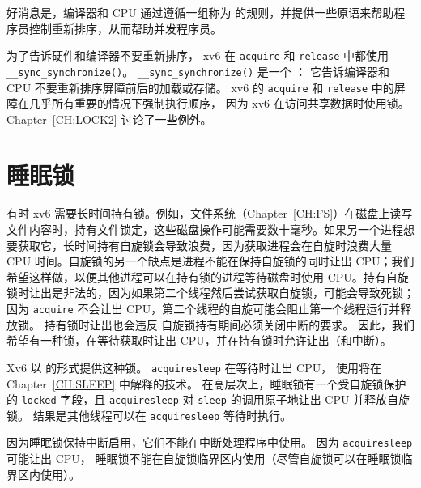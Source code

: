 好消息是，编译器和 CPU 通过遵循一组称为
的规则，并提供一些原语来帮助程序员控制重新排序，从而帮助并发程序员。

为了告诉硬件和编译器不要重新排序，
xv6 在
\lstinline{acquire} 
和
\lstinline{release} 
中都使用
\lstinline{__sync_synchronize()}。
\lstinline{__sync_synchronize()}
是一个
：
它告诉编译器和 CPU 不要重新排序屏障前后的加载或存储。
xv6 的
\lstinline{acquire}
和
\lstinline{release}
中的屏障在几乎所有重要的情况下强制执行顺序，
因为 xv6 在访问共享数据时使用锁。
Chapter~\ref{CH:LOCK2} 讨论了一些例外。

\section{睡眠锁}


有时 xv6 需要长时间持有锁。例如，文件系统（Chapter~\ref{CH:FS}）在磁盘上读写文件内容时，持有文件锁定，这些磁盘操作可能需要数十毫秒。如果另一个进程想要获取它，长时间持有自旋锁会导致浪费，因为获取进程会在自旋时浪费大量 CPU 时间。自旋锁的另一个缺点是进程不能在保持自旋锁的同时让出 CPU；我们希望这样做，以便其他进程可以在持有锁的进程等待磁盘时使用 CPU。持有自旋锁时让出是非法的，因为如果第二个线程然后尝试获取自旋锁，可能会导致死锁；因为 {\tt acquire} 不会让出 CPU，第二个线程的自旋可能会阻止第一个线程运行并释放锁。
持有锁时让出也会违反
自旋锁持有期间必须关闭中断的要求。
因此，我们希望有一种锁，在等待获取时让出 CPU，并在持有锁时允许让出（和中断）。

Xv6 以
的形式提供这种锁。
\lstinline{acquiresleep}
在等待时让出 CPU，
使用将在
Chapter~\ref{CH:SLEEP}
中解释的技术。
在高层次上，睡眠锁有一个受自旋锁保护的
\lstinline{locked}
字段，且
\lstinline{acquiresleep} 对
\lstinline{sleep}
的调用原子地让出 CPU 并释放自旋锁。
结果是其他线程可以在
\lstinline{acquiresleep}
等待时执行。

因为睡眠锁保持中断启用，它们不能在中断处理程序中使用。
因为
\lstinline{acquiresleep}
可能让出 CPU，
睡眠锁不能在自旋锁临界区内使用（尽管自旋锁可以在睡眠锁临界区内使用）。

